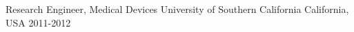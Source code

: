 \begin{cventries}





\cventry
{Research Engineer, Medical Devices}
{University of Southern California}
{California, USA}
{2011-2012}
{}

\end{cventries}
